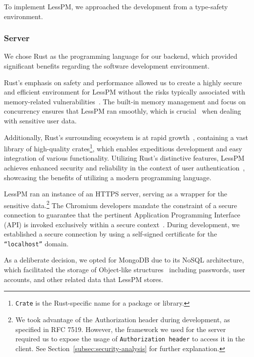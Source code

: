 To implement LessPM, we approached the development from a type-safety
environment.

\subsubsection{Server}
We chose Rust as the programming language for our backend, which provided
significant benefits regarding the software development environment.

Rust's emphasis on safety and performance allowed us to create a highly
secure and efficient environment for LessPM without the risks typically
associated with memory-related vulnerabilities~\cite{rivera2019preserving}.
The built-in memory management and focus on concurrency ensures that LessPM
ran smoothly, which is crucial~\cite{fischer1985impossibility} when
dealing with sensitive user data.

Additionally, Rust's surrounding ecosystem is at rapid
growth~\cite{librs-stats}, containing a vast library of high-quality
crates\footnote{
  \texttt{Crate} is the Rust-specific name for a package or library.
}, which enables expeditious development and easy integration of various
functionality.
Utilizing Rust's distinctive features, LessPM achieves enhanced security and
reliability in the context of user authentication~\cite{rivera2019preserving},
showcasing the benefits of utilizing a modern programming language.

LessPM ran an instance of an HTTPS server, serving as a wrapper for the
sensitive data.\footnote{
  We took advantage of the Authorization header during development, as specified
  in RFC 7519.
  However, the framework we used for the server required us to expose the usage
  of \texttt{Authorization header} to access it in the client.
  See Section~\ref{subsec:security-analysis} for further explanation.
}
The Chromium developers mandate the constraint of a secure connection to
guarantee that the pertinent Application Programming Interface (API) is invoked
exclusively within a secure context~\cite{webdev2021credential}.
During development, we established a secure connection by using a self-signed
certificate for the \texttt{``localhost''} domain.

As a deliberate decision, we opted for MongoDB due to its NoSQL architecture,
which facilitated the storage of Object-like structures~\cite{mongodb2021nosql}
including passwords, user accounts, and other related data that LessPM stores.

